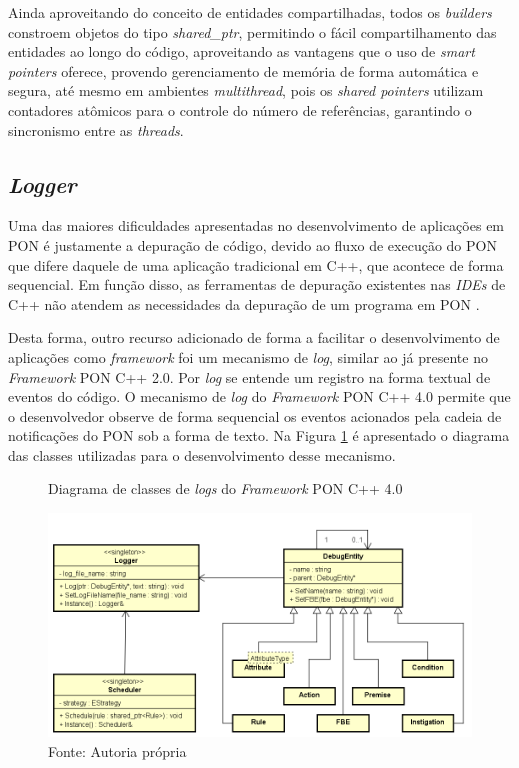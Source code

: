 Ainda aproveitando do conceito de entidades compartilhadas, todos os
\textit{builders} constroem objetos do tipo \textit{shared\_ptr}, permitindo o
fácil compartilhamento das entidades ao longo do código, aproveitando as
vantagens que o uso de \textit{smart pointers} oferece, provendo gerenciamento
de memória de forma automática e segura, até mesmo em ambientes
\textit{multithread}, pois os \textit{shared pointers} utilizam contadores
atômicos para o controle do número de referências, garantindo o sincronismo
entre as \textit{threads}.

\subsection{\textit{Logger}}

Uma das maiores dificuldades apresentadas no desenvolvimento de aplicações em
PON é justamente a depuração de código, devido ao fluxo de execução do PON que
difere daquele de uma aplicação tradicional em C++, que acontece de forma
sequencial. Em função disso, as ferramentas de depuração existentes nas
\textit{IDEs} de C++ não atendem as necessidades da depuração de um programa em
PON \cite{msc_Ronszcka_2012}.

Desta forma, outro recurso adicionado de forma a facilitar o desenvolvimento de
aplicações como  \textit{framework} foi um mecanismo de \textit{log}, similar ao
já presente no \textit{Framework} PON C++ 2.0. Por \textit{log} se entende um
registro na forma textual de eventos do código. O mecanismo de \textit{log} do
\textit{Framework} PON C++ 4.0 permite que o desenvolvedor observe de forma
sequencial os eventos acionados pela cadeia de notificações do PON sob a forma
de texto. Na Figura \ref{fig:class_fw4_log} é apresentado o diagrama das classes
utilizadas para o desenvolvimento desse mecanismo.

\begin{figure}[!htb]
    \centering
    \caption{Diagrama de classes de \textit{logs} do \textit{Framework} PON C++
    4.0}
    \includegraphics[width=\textwidth]{../figures/logger_class.png}
    \smallskip
    \caption*{Fonte: Autoria própria}
    \label{fig:class_fw4_log}
\end{figure}

